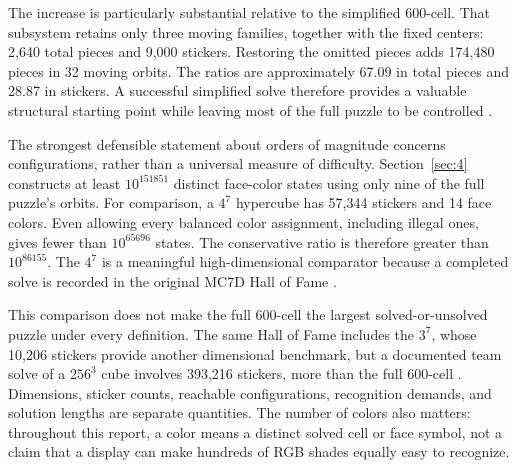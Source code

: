 \documentclass[a4paper,11pt]{article}
\begin{document}
The increase is particularly substantial relative to the simplified 600-cell. That subsystem retains only three moving families, together with the fixed centers: 2,640 total pieces and 9,000 stickers. Restoring the omitted pieces adds 174,480 pieces in 32 moving orbits. The ratios are approximately 67.09 in total pieces and 28.87 in stickers. A successful simplified solve therefore provides a valuable structural starting point while leaving most of the full puzzle to be controlled \cite{transcript,algorithms,nanma}.

The strongest defensible statement about orders of magnitude concerns configurations, rather than a universal measure of difficulty. Section~\ref{sec:4} constructs at least \(10^{151851}\) distinct face-color states using only nine of the full puzzle's orbits. For comparison, a \(4^{7}\) hypercube has 57,344 stickers and 14 face colors. Even allowing every balanced color assignment, including illegal ones, gives fewer than \(10^{65696}\) states. The conservative ratio is therefore greater than \(10^{86155}\). The \(4^{7}\) is a meaningful high-dimensional comparator because a completed solve is recorded in the original MC7D Hall of Fame \cite{mc7d}.

This comparison does not make the full 600-cell the largest solved-or-unsolved puzzle under every definition. The same Hall of Fame includes the \(3^{7}\), whose 10,206 stickers provide another dimensional benchmark, but a documented team solve of a \(256^{3}\) cube involves 393,216 stickers, more than the full 600-cell \cite{mc7d,largecube}. Dimensions, sticker counts, reachable configurations, recognition demands, and solution lengths are separate quantities. The number of colors also matters: throughout this report, a color means a distinct solved cell or face symbol, not a claim that a display can make hundreds of RGB shades equally easy to recognize.
\end{document}

